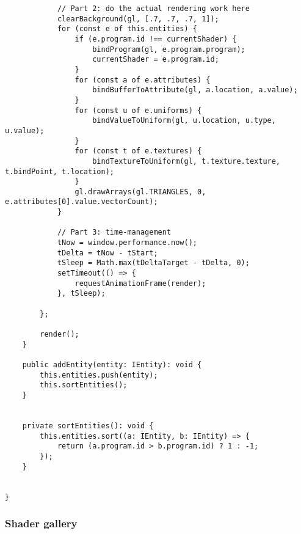 \begin{lstlisting}
            // Part 2: do the actual rendering work here
            clearBackground(gl, [.7, .7, .7, 1]);
            for (const e of this.entities) {
                if (e.program.id !== currentShader) {
                    bindProgram(gl, e.program.program);
                    currentShader = e.program.id;
                }
                for (const a of e.attributes) {
                    bindBufferToAttribute(gl, a.location, a.value);
                }
                for (const u of e.uniforms) {
                    bindValueToUniform(gl, u.location, u.type, u.value);
                }
                for (const t of e.textures) {
                    bindTextureToUniform(gl, t.texture.texture, t.bindPoint, t.location);
                }
                gl.drawArrays(gl.TRIANGLES, 0, e.attributes[0].value.vectorCount);
            }

            // Part 3: time-management
            tNow = window.performance.now();
            tDelta = tNow - tStart;
            tSleep = Math.max(tDeltaTarget - tDelta, 0);
            setTimeout(() => {
                requestAnimationFrame(render);
            }, tSleep);

        };

        render();
    }

    public addEntity(entity: IEntity): void {
        this.entities.push(entity);
        this.sortEntities();
    }


    private sortEntities(): void {
        this.entities.sort((a: IEntity, b: IEntity) => {
            return (a.program.id > b.program.id) ? 1 : -1;
        });
    }


}
\end{lstlisting}

\subsubsection{Shader gallery}


